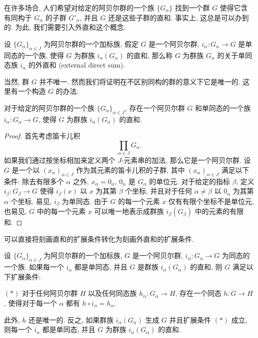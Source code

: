 在许多场合, 人们希望对给定的阿贝尔群的一个族 $\{G_{\alpha}\}$ 找到一个群 $G$ 使得它含有同构于 $G_{\alpha}$ 的子群 $G'_{\alpha}$, 并且 $G$ 还是这些子群的直和. 事实上, 这总是可以办到的. 为此, 我们需要引入外直和这个概念.

\begin{definition}\label{ch11:def-external-direct-sum}
设 $\{G_{\alpha}\}_{\alpha\in J}$ 为阿贝尔群的一个加标族. 假定 $G$ 是一个阿贝尔群, $i_{\alpha}\colon G_{\alpha}\to G$ 是单同态的一个族, 使得 $G$ 为群族 $i_{\alpha}(G_{\alpha})$ 的直和, 那么称 $G$ 为群族 $G_{\alpha}$ 的关于单同态族 $i_{\alpha}$ 的外直和 (external direct sum).
\end{definition}

当然, 群 $G$ 并不唯一. 然而我们将证明在不区别同构的群的意义下它是唯一的. 这里有一个构造 $G$ 的办法.

\begin{theorem}\label{ch11:thm-external-existence}
对于给定的阿贝尔群的一个族 $\{G_{\alpha}\}_{\alpha\in J}$, 存在一个阿贝尔群 $G$ 和单同态的一个族 $i_{\alpha}\colon G_{\alpha}\to G$, 使得 $G$ 为群族 $i_{\alpha}(G_{\alpha})$ 的直和.
\end{theorem}

\begin{proof}
首先考虑笛卡儿积
\[
\prod_{\alpha\in J}G_{\alpha}.
\]
如果我们通过按坐标相加来定义两个 $J$-元素串的加法, 那么它是一个阿贝尔群. 设 $G$ 是一个以 $(x_{\alpha})_{\alpha\in J}$ 作为其元素的笛卡儿积的子群, 其中 $(x_{\alpha})_{\alpha\in J}$ 满足以下条件: 除去有限多个 $\alpha$ 之外, $x_{\alpha}=0_{\alpha}$, $0_{\alpha}$ 是 $G_{\alpha}$ 的单位元. 对于给定的指标 $\beta$, 定义 $i_{\beta}\colon G_{\beta}\to G$ 使得 $i_{\beta}(x)$ 以 $x$ 为其第 $\beta$ 个坐标, 并且对于任何 $\alpha\neq\beta$ 以 $0_{\alpha}$ 为其第 $\alpha$ 个坐标. 易见, $i_{\beta}$ 为单同态. 由于 $G$ 的每一个元素 $x$ 仅有有限个坐标不是单位元, 也易见, $G$ 中的每一个元素 $x$ 可以唯一地表示成群族 $i_{\beta}(G_{\beta})$ 中的元素的有限和.
\end{proof}

可以直接将刻画直和的扩展条件转化为刻画外直和的扩展条件.

\begin{theorem}\label{ch11:thm-external-extension}
设 $\{G_{\alpha}\}_{\alpha\in J}$ 为阿贝尔群的一个加标族, $G$ 是一个阿贝尔群, $i_{\alpha}\colon G_{\alpha}\to G$ 为同态的一个族. 如果每一个 $i_{\alpha}$ 都是单同态, 并且 $G$ 是群族 $i_{\alpha}(G_{\alpha})$ 的直和, 则 $G$ 满足以下扩展条件:

$(*)$ 对于任何阿贝尔群 $H$ 以及任何同态族 $h_{\alpha}\colon G_{\alpha}\to H$, 存在一个同态 $h\colon G\to H$, 使得对于每一个 $\alpha$ 都有 $h\circ i_{\alpha}=h_{\alpha}$.

此外, $h$ 还是唯一的. 反之, 如果群族 $i_{\alpha}(G_{\alpha})$ 生成 $G$ 并且扩展条件 $(*)$ 成立, 则每一个 $i_{\alpha}$ 都是单同态, 并且 $G$ 为群族 $i_{\alpha}(G_{\alpha})$ 的直和.
\end{theorem}

